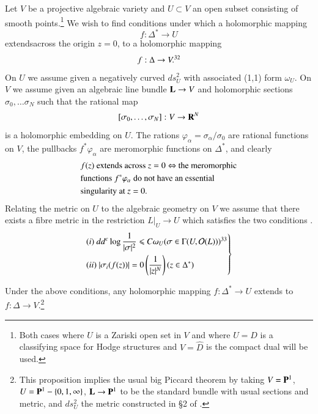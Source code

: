Let $V$ be a projective algebraic variety and $U \subset V$ an open subset consisting of smooth points.\footnote[31]{Both cases where $U$ is a Zariski open set in $V$ and where $U = D$ is a classifying space for Hodge structures and $V = \hat{D}$ is the compact dual will be used.} We wish to find conditions under which a holomorphic mapping
$$
f : \Delta^\ast \to U
$$
extends\pageoriginale across the origin $z =0$, to a holomorphic mapping
$$
f: \Delta \to V.\footnotemark[32]{}
$$
On $U$ we assume given a negatively curved $ds^2_U$ with associated (1,1) form $\omega_U$. On $V$ we assume given an algebraic line bundle $\mathbf{L} \to V$ and holomorphic sections $\sigma_0, \ldots \sigma_N$ such that the rational map
$$
[\sigma_0, \ldots, \sigma_N]: V \to\mathbf{R}^N
$$
is a holomorphic embedding on $U$. The rations $\varphi_\alpha = \sigma_\alpha / \sigma_0$ are rational functions on $V$, the pullbacks $f^\ast \varphi_\alpha$ are meromorphic functions on $\Delta^\ast$, and clearly
\setcounter{equation}{0}
\begin{align}
& \text{$f(z)$ extends across $z = 0  \Leftrightarrow$ the meromorphic} \notag\\
& \text{functions $f^\ast\varphi_\alpha$ do not have an essential}\notag\\
& \text{singularity at $z = 0$.} \label{art4-eq8.1}
\end{align}
Relating the metric on $U$ to the algebraic geometry on $V$ we assume that there exists a fibre metric in the restriction $L|_U \to U$ which satisfies the two conditions 
.
\begin{equation}
\left.
\begin{aligned}
&  (i)~ dd^c \log \frac{1}{|\sigma|^2} \leqslant C \omega_U (\sigma \in \Gamma (U, \cO (L)))\footnotemark[33]{}\\
& (ii)~ |\sigma_i (f(z))| = 0 \left(\frac{1}{|z|^N} \right) (z \in \Delta^\ast)
\end{aligned}
\right\} \label{art4-eq8.2}
\end{equation}

\setcounter{proposition}{2}
\begin{proposition}\label{art4-prop8.3}
Under the above conditions, any holomorphic mapping $f : \Delta^\ast \to U$ extends to $f : \Delta \to V$.\footnote[34]{This proposition implies the usual big Piccard theorem by taking $V = \mathbf{P}^1$, $U= \mathbf{P}^1 - \{0, 1, \infty\}$, $\mathbf{L} \to \mathbf{P}^1$ to be the standard bundle with usual sections and metric, and $ds^2_U$ the metric constructed in \S 2 of \cite{art4-key24}.}
\end{proposition}

